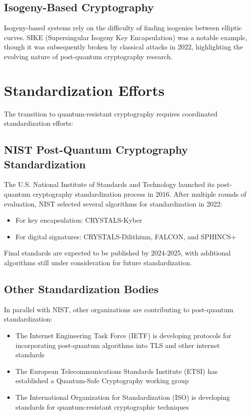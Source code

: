 \subsection{Isogeny-Based Cryptography}
Isogeny-based systems rely on the difficulty of finding isogenies between elliptic curves. SIKE (Supersingular Isogeny Key Encapsulation) was a notable example, though it was subsequently broken by classical attacks in 2022, highlighting the evolving nature of post-quantum cryptography research.

\section{Standardization Efforts}
The transition to quantum-resistant cryptography requires coordinated standardization efforts:

\subsection{NIST Post-Quantum Cryptography Standardization}
The U.S. National Institute of Standards and Technology launched its post-quantum cryptography standardization process in 2016. After multiple rounds of evaluation, NIST selected several algorithms for standardization in 2022:
\begin{itemize}
    \item For key encapsulation: CRYSTALS-Kyber
    \item For digital signatures: CRYSTALS-Dilithium, FALCON, and SPHINCS+
\end{itemize}

Final standards are expected to be published by 2024-2025, with additional algorithms still under consideration for future standardization.

\subsection{Other Standardization Bodies}
In parallel with NIST, other organizations are contributing to post-quantum standardization:
\begin{itemize}
    \item The Internet Engineering Task Force (IETF) is developing protocols for incorporating post-quantum algorithms into TLS and other internet standards
    \item The European Telecommunications Standards Institute (ETSI) has established a Quantum-Safe Cryptography working group
    \item The International Organization for Standardization (ISO) is developing standards for quantum-resistant cryptographic techniques
\end{itemize}

